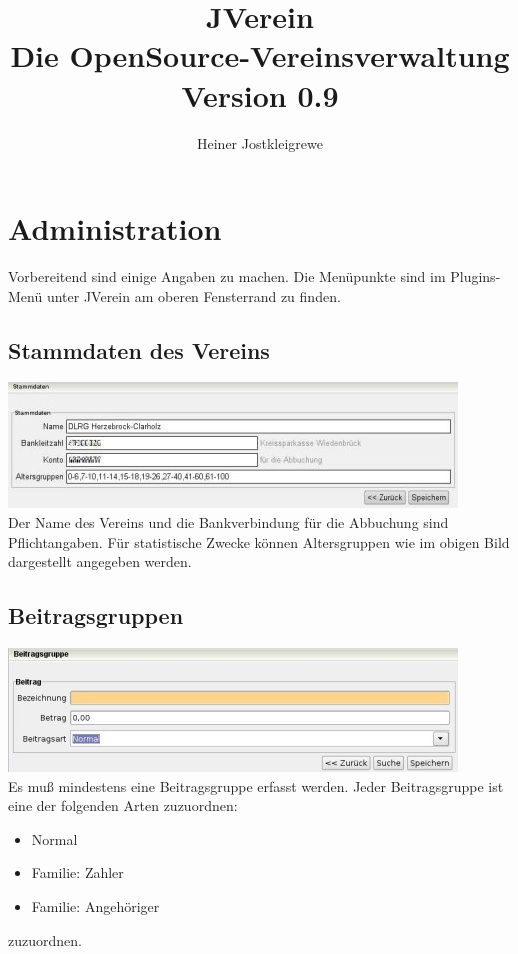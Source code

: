 \documentclass[a4paper,BCOR30mm,DIV14,pdftex,liststotoc,footsepline,openany]{scrbook}
\author{Heiner Jostkleigrewe}
\title{JVerein \\ Die OpenSource-Vereinsverwaltung\\Version 0.9}
\begin{document}
\maketitle
\tableofcontents

\chapter{Administration}
Vorbereitend sind einige Angaben zu machen. Die Menüpunkte sind im Plugins-Menü unter JVerein am oberen Fensterrand zu finden.

\section{Stammdaten des Vereins}
\includegraphics{./screenshots/stammdaten.jpg}\\
Der Name des Vereins und die Bankverbindung für die Abbuchung sind Pflichtangaben. Für statistische Zwecke können
Altersgruppen wie im obigen Bild dargestellt angegeben werden.

\section{Beitragsgruppen}
\label{beitragsgruppen}
\includegraphics{./screenshots/beitragsgruppe.jpg}\\
Es muß mindestens eine Beitragsgruppe erfasst werden. Jeder Beitragsgruppe ist eine der folgenden Arten zuzuordnen:
\begin{itemize}
 \item Normal
 \item Familie: Zahler
 \item Familie: Angehöriger
\end{itemize}
zuzuordnen. 
\end{document}

